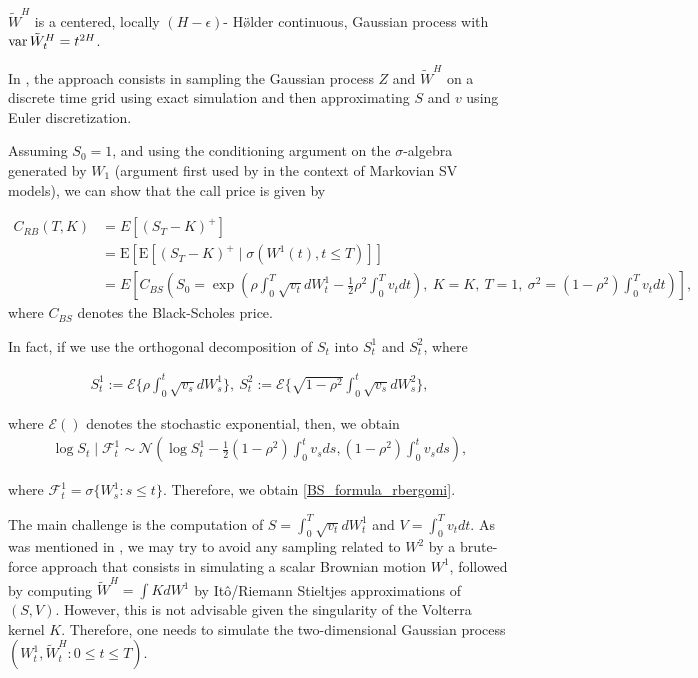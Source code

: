\documentclass[11pt]{article}
\newcommand{\expt}[1]{\mathrm{E}\left[#1\right]}
\begin{document}
$\tilde{W}^H $ is a centered, locally $(H-\epsilon)$- H\" \o lder continuous, Gaussian process with $\operatorname{var}{\tilde{W}^H_t} = t^{2H}$.


In \cite{bayer2016pricing}, the  approach consists in sampling the Gaussian process $Z$ and $\tilde{W}^H$ on a discrete time grid using exact simulation and then approximating $S$ and $v$ using Euler  discretization.

Assuming $S_0 = 1$, and using the conditioning argument on the $\sigma$-algebra generated by $W_1$ (argument first used by \cite{romano1997contingent} in the context of Markovian SV
models), we can  show that the call price is given by

\begin{align}\label{BS_formula_rbergomi}
	C_{RB}\left( T, K \right) &= E\left[ \left(S_T - K \right)^+ \right]  \nonumber\\
	&=\expt{\expt{(S_T-K)^+ \mid \sigma(W^1(t) ,t \le T)}}\nonumber \\
	&=E\left[C_{BS}\left( S_0 = \operatorname{exp}\left(\rho \int_0^T \sqrt{v_t} dW_t^1 - \frac{1}{2}
	\rho^2 \int_0^T v_t dt\right),\ K = K, \ T = 1, \ \sigma^2 = (1-\rho^2)
	\int_0^T v_t dt \right) \right],
\end{align}
where $C_{BS}$ denotes the Black-Scholes price.

In fact, if we use the orthogonal decomposition of $S_t$ into $S_{t}^1$ and $S_{t}^2$, where

\begin{align}
	S_t^1:=\mathcal{E}\{ \rho \int_{0}^{t}  \sqrt{v_s} dW_s^1\}, \: S_t^2:= \mathcal{E}\{ \sqrt{1-\rho^2} \int_{0}^{t}  \sqrt{v_s} dW_s^2  \}	,
\end{align}

where $\mathcal{E}()$ denotes the stochastic exponential, then, we obtain
\begin{align}
	\log S_t \mid \mathcal{F}_t^1 \sim \mathcal{N}\left( \log S_t^1-\frac{1}{2} (1-\rho^2) \int_{0}^{t} v_s ds , (1-\rho^2) \int_{0}^{t} v_s ds \right),
\end{align} 

where $\mathcal{F}_t^1= \sigma\{ W_s^1: s\le t\}$. Therefore, we obtain \eqref{BS_formula_rbergomi}.


The main challenge is the computation of $S=\int_{0}^{T} \sqrt{v_t} dW_t^1$ and $V=\int_{0}^{T} v_t dt$. As was mentioned in \cite{bayer2017regularity}, we may try to
avoid any sampling related to $W^2$ by   a brute-force approach that  consists in simulating a scalar Brownian motion $W^1$, followed by computing  $\tilde{W}^H= \int K dW^1$  by It\^o/Riemann Stieltjes approximations of $(S,V)$. However, this is not advisable given the singularity of the Volterra kernel $K$. Therefore,  one needs to simulate the two-dimensional Gaussian process $(W_t^1, \tilde{W}^H_t: 0 \le t \le T)$.
\end{document}

